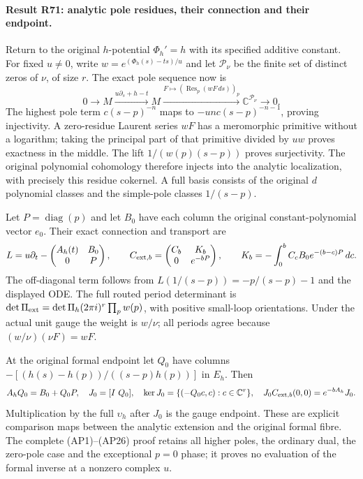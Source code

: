 \paragraph{Result R71: analytic pole residues, their connection and their endpoint.}
Return to the original $h$-potential $\Phi_h'=h$ with its
specified additive constant. For fixed $u\ne0$, write
$w=e^{(\Phi_h(s)-ts)/u}$ and let
$\mathcal P_\nu$ be the finite set of distinct zeros of $\nu$,
of size $r$. The exact pole sequence now is
\[
0\longrightarrow M\xrightarrow{u\partial_s+h-t}M
\xrightarrow{F\mapsto(\operatorname{Res}_p(wF\,ds))_p}
\mathbb C^{\mathcal P_\nu}\longrightarrow0.
\]
The highest pole term $c(s-p)^{-n}$ maps to
$-unc(s-p)^{-n-1}$, proving injectivity. A zero-residue
Laurent series $wF$ has a meromorphic primitive without a
logarithm; taking the principal part of that primitive
divided by $uw$ proves exactness in the middle.
The lift $1/(w(p)(s-p))$ proves surjectivity.
The original polynomial cohomology therefore injects into
the analytic localization, with precisely this residue
cokernel. A full basis consists of the original $d$ polynomial
classes and the simple-pole classes $1/(s-p)$.

Let $P=\operatorname{diag}(p)$ and let $B_0$ have each column
the original constant-polynomial vector $e_0$. Their exact
connection and transport are
\[
L=u\partial_t-
\begin{pmatrix}A_h(t)&B_0\\0&P\end{pmatrix},\qquad
C_{{\rm ext},b}=
\begin{pmatrix}C_b&K_b\\0&e^{-bP}\end{pmatrix},\qquad
K_b=-\int_0^bC_cB_0e^{-(b-c)P}\,dc.
\]
The off-diagonal term follows from
$L(1/(s-p))=-p/(s-p)-1$ and the displayed ODE. The full
routed period determinant is
$\det\Pi_{\rm ext}=\det\Pi_h(2\pi i)^r\prod_pw(p)$,
with positive small-loop orientations. Under the actual
unit gauge the weight is $w/\nu$; all periods agree
because $(w/\nu)(\nu F)=wF$.

At the original formal endpoint let $Q_0$ have columns
$-[(h(s)-h(p))/((s-p)h(p))]$ in $E_h$. Then
\[
A_hQ_0=B_0+Q_0P,\quad J_0=[I\ Q_0],\quad
\ker J_0=\{(-Q_0c,c):c\in\mathbb C^r\},\quad
J_0C_{{\rm ext},b}(0,0)=e^{-bA_h}J_0.
\]
Multiplication by the full $\upsilon_h$ after $J_0$ is the
gauge endpoint. These are explicit comparison maps between
the analytic extension and the original formal fibre.
The complete (AP1)--(AP26) proof retains all higher poles,
the ordinary dual, the zero-pole case and the exceptional
$p=0$ phase; it proves no evaluation of the formal inverse
at a nonzero complex $u$.

